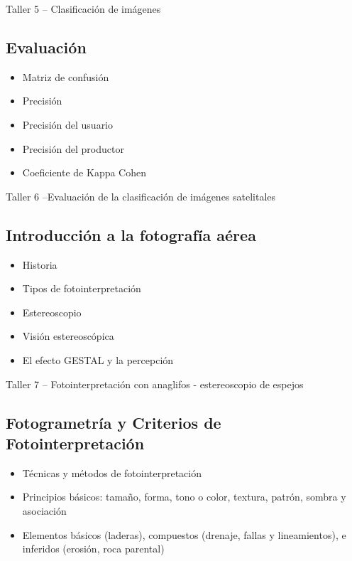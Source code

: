 \documentclass[a4paper,twoside,11pt,]{article}
\begin{document}
\begin{tcolorbox}[enhanced,width=5in,center upper,  fontupper=\large\bfseries,drop shadow southwest,sharp corners]
Taller 5 -- Clasificación de imágenes
\end{tcolorbox}

\subsection {Evaluación}
\begin{itemize}
\item Matriz de confusión
\item Precisión
\item Precisión del usuario
\item Precisión del productor
\item Coeficiente de Kappa Cohen
\end{itemize}

\begin{tcolorbox}[enhanced,width=5in,center upper,  fontupper=\large\bfseries,drop shadow southwest,sharp corners]
Taller 6 --Evaluación de la clasificación de imágenes satelitales
\end{tcolorbox}

\subsection {Introducción a la fotografía aérea}
\begin{itemize}
\item Historia
\item Tipos de fotointerpretación
\item Estereoscopio
\item Visión estereoscópica
\item El efecto GESTAL y la percepción
\end{itemize}

\begin{tcolorbox}[enhanced,width=5in,center upper,  fontupper=\large\bfseries,drop shadow southwest,sharp corners]
Taller 7 -- Fotointerpretación con anaglifos - estereoscopio de espejos
\end{tcolorbox}

\subsection {Fotogrametría y Criterios de Fotointerpretación}
\begin{itemize}
\item Técnicas y métodos de fotointerpretación 
\item Principios básicos: tamaño, forma, tono o color, textura, patrón, sombra y asociación
\item Elementos básicos (laderas), compuestos (drenaje, fallas y lineamientos), e inferidos (erosión, roca parental)
\end{itemize}
\end{document}
